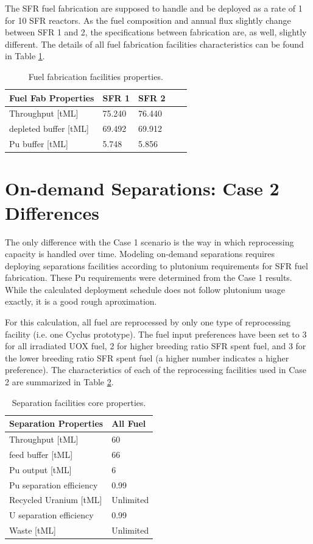\documentclass[12pt]{article}
\begin{document}
The SFR fuel fabrication are supposed to handle and be deployed as a rate of 1
for 10 SFR reactors.  As the fuel composition and annual flux slightly change
between SFR 1 and 2, the specifications between fabrication are, as well,
slightly different. The details of all fuel fabrication facilities
characteristics can be found in Table \ref{tab:fuelfab_1}.

\begin{table}[h!]
    \centering
    \begin{tabular}{lllll}
    \hline
    Fuel Fab Properties	&	SFR 1	&	SFR 2	\\
    \hline
    Throughput [tML]	&	75.240	&	76.440	\\
    depleted buffer [tML]	&	69.492	&	69.912	\\
    Pu buffer  [tML]		&	5.748	&	5.856	\\
    \hline
    \end{tabular}
    \caption{Fuel fabrication facilities properties.}
    \label{tab:fuelfab_1}
\end{table}

\section{On-demand Separations: Case 2 Differences}
\label{sec:case2}

The only difference with the Case 1 scenario is the way in
which reprocessing capacity is handled over time.  Modeling on-demand
separations requires deploying separations facilities according to plutonium
requirements for SFR fuel fabrication.  These Pu requirements were determined
from the Case 1 results. While the calculated deployment schedule does not
follow plutonium usage exactly, it is a good rough aproximation. 

For this calculation, all fuel are reprocessed by only one type of
reprocessing facility (i.e. one Cyclus prototype). The fuel input preferences
have been set to 3 for all irradiated UOX fuel, 2 for higher breeding ratio
SFR spent fuel, and 3 for the lower breeding ratio SFR spent fuel (a higher
number indicates a higher preference).  The characteristics of each of the
reprocessing facilities used in Case 2 are summarized in Table
\ref{tab:fuelfab_2}.

\begin{table}[h!]
    \centering
    \begin{tabular}{ll}
    \hline
    Separation Properties	&	All Fuel	\\
    \hline
    Throughput [tML]		&	60		\\
    feed buffer [tML]		&	66		\\
    Pu output  [tML]		&	6		\\
    Pu separation efficiency	&	0.99		\\
    Recycled Uranium [tML]	&	Unlimited	\\
    U separation efficiency	&	0.99		\\
    Waste [tML]			&	Unlimited	\\
    \hline
    \end{tabular}
    \caption{Separation facilities core properties.}
    \label{tab:fuelfab_2}
\end{table}
\end{document}
